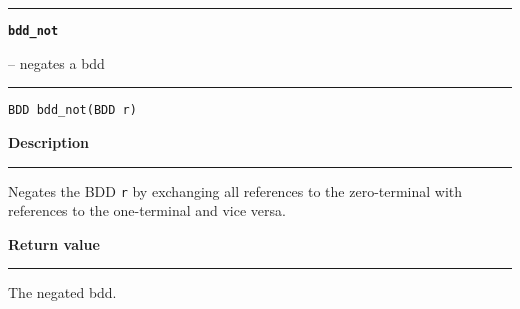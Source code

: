 \begin{minipage}{\textwidth}

\noindent\begin{minipage}{\textwidth}
\rule{\textwidth}{0.5mm}
{\tt\bf bdd\_not }
\--- negates a bdd  \hspace{\fill}
\\\rule[1.5ex]{\textwidth}{0.5mm}
\end{minipage}

\noindent\begin{verbatim}
BDD bdd_not(BDD r) 
\end{verbatim}

\vspace{\parsep}\noindent
{\bf Description}\\\rule[1.5ex]{\textwidth}{0.2mm}\vspace{-1.5ex}\setlength{\parindent}{1em}
Negates the BDD {\tt r} by exchanging
           all references to the zero-terminal with references to the
	   one-terminal and vice versa. 

\setlength{\parindent}{0em}\vspace{\parsep}\vspace{\baselineskip}\noindent
{\bf Return value}\\\rule[1.5ex]{\textwidth}{0.2mm}\vspace{-1.5ex}
The negated bdd. 
\end{minipage}
\vspace{8ex}
